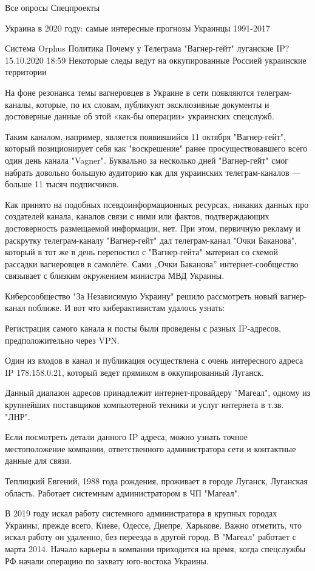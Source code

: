 Все опросы
Спецпроекты

    Украина в 2020 году: самые интересные прогнозы
    Украинцы 1991-2017

Система Orphus
Политика
Почему у Телеграма "Вагнер-гейт" луганские IP?
15.10.2020 18:59
Некоторые следы ведут на оккупированные Россией украинские территории

На фоне резонанса темы вагнеровцев в Украине в сети появляются телеграм-каналы, которые, по их словам, публикуют эксклюзивные документы и достоверные данные об этой «как-бы операции» украинских спецслужб.

Таким каналом, например, является появившийся 11 октября "Вагнер-гейт", который позиционирует себя как "воскрешение" ранее просуществовавшего всего один день канала "Vagner". Буквально за несколько дней "Вагнер-гейт" смог набрать довольно большую аудиторию как для украинских телеграм-каналов --- больше 11 тысяч подписчиков.

Как принято на подобных псевдоинформационных ресурсах, никаких данных про создателей канала, каналов связи с ними или фактов, подтверждающих достоверность размещаемой информации, нет. При этом, первичную рекламу и раскрутку телеграм-каналу "Вагнер-гейт" дал телеграм-канал "Очки Баканова", который в тот же в день перепостил с "Вагнер-гейта" материал со схемой рассадки вагнеровцев в самолёте. Сами „Очки Баканова” интернет-сообщество связывает с близким окружением министра МВД Украины.

Киберсообщество "За Независимую Украину" решило рассмотреть новый вагнер-канал поближе. И вот что киберактивистам удалось узнать:

Регистрация самого канала и посты были проведены с разных IP-адресов, предположительно через VPN.

Один из входов в канал и публикация осуществлена с очень интересного адреса IP 178.158.0.21, который ведет прямиком в оккупированный Луганск.

Данный диапазон адресов принадлежит интернет-провайдеру "Магеал", одному из крупнейших поставщиков компьютерной техники и услуг интернета в т.зв. "ЛНР".

Если посмотреть детали данного IP адреса, можно узнать точное местоположение компании, ответственного администратора сети и контактные данные для связи.

Теплицкий Евгений, 1988 года рождения, проживает в городе Луганск, Луганская область. Работает системным администратором в ЧП "Магеал".

В 2019 году искал работу системного администратора в крупных городах Украины, прежде всего, Киеве, Одессе, Днепре, Харькове. Важно отметить, что искал работу он удаленно, без переезда в другой город. В "Магеал" работает с марта 2014. Начало карьеры в компании приходится на время, когда спецслужбы РФ начали операцию по захвату юго-востока Украины.

